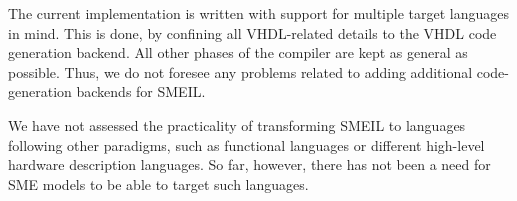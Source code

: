 The current \libsme{} implementation is written with support for multiple target
languages in mind. This is done, by confining all VHDL-related details to the
VHDL code generation backend. All other phases of the compiler are kept as
general as possible. Thus, we do not foresee any problems related to adding
additional code-generation backends for SMEIL.

We have not assessed the practicality of transforming SMEIL to languages
following other paradigms, such as functional languages or different high-level
hardware description languages. So far, however, there has not been a need for
SME models to be able to target such languages.



